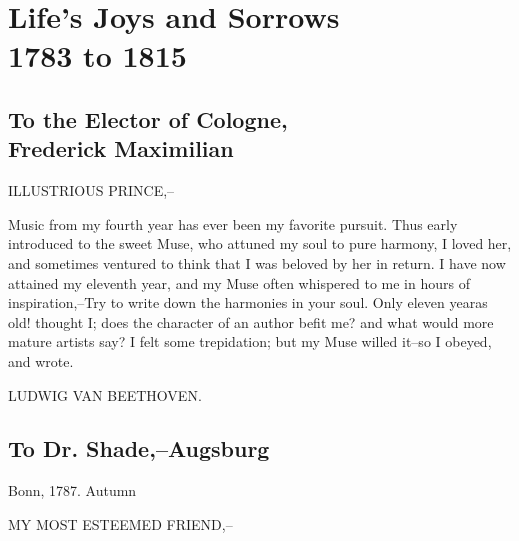 \documentclass[12pt,oneside]{book}
\begin{document}
\tableofcontents 

\mainmatter

\part{Life's Joys and Sorrows\\1783 to 1815}

\chapter[To the Elector of Cologne,\\Frederick Maximilian]{To the Elector of Cologne,\\Frederick Maximilian\raisebox{.3\baselineskip}{\normalsize\footnotemark}}

ILLUSTRIOUS PRINCE,--

Music from my fourth year has ever been my favorite pursuit. Thus early introduced to the sweet Muse, who attuned
my soul to pure harmony, I loved her, and sometimes ventured to think that I was beloved by her in return. I have now attained my 
eleventh year, and my Muse often whispered to me in hours of inspiration,--Try to write down the harmonies in your soul. 
Only eleven yearas old! thought I; does the character of an author befit me? and what would more mature artists say?
I felt some trepidation; but my Muse willed it--so I obeyed, and wrote. \par
\begin{flushright}
    LUDWIG VAN BEETHOVEN.
\end{flushright}


\chapter{To Dr. Shade,--Augsburg}
\begin{flushright}
    Bonn, 1787. Autumn
\end{flushright}
MY MOST ESTEEMED FRIEND,-- \par 
\end{document}
